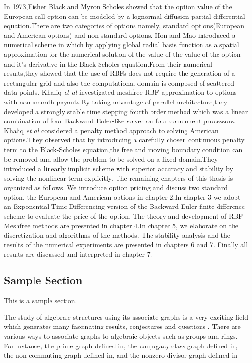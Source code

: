 \documentclass[12pt]{article}
\numberwithin{equation}{section} %
\begin{document}
In 1973,Fisher Black and Myron Scholes showed that the option value
of the European call option can be modeled by a lognormal diffusion
partial differential equation.There are two categories of options
namely, standard options(European and American options) and non
standard options.
 Hon and Mao\cite{Hon} introduced a numerical scheme in which by
 applying global radial basis function as a spatial approximation
 for the numerical solution of the value of the  value of the option
 and it's derivative in the Black-Scholes equation.From their
 numerical results,they showed that the use of RBFs does not require
 the generation of a rectangular grid and also the computational
 domain is composed of scattered data points.
 Khaliq \textit{et al}\cite{KK} investigated meshfree RBF approximation to
 options with non-smooth payouts.By taking advantage of parallel
 architecture,they developed a strongly stable time stepping fourth
 order method which was a linear combination of four Backward
 Euler-like solver on four concurrent processors.
 Khaliq \textit{et al}\cite{ADS06} considered a penalty method
 approach to solving  American options.They observed that by
 introducing a carefully chosen continuous penalty term to the
 Black-Scholes equation,the free and moving boundary condition can
 be removed and allow the problem to be solved on a fixed
 domain.They introduced a linearly implicit scheme with superior
 accuracy and stability by solving the nonlinear term explicitly.
 The remaining chapters of this thesis is organized  as follows.
 We introduce option pricing and discuss two standard option,
 the European and American options in chapter 2.In chapter 3 we adopt an Exponential
 Time Differencing version of the Backward Euler finite difference
  scheme to evaluate the price of the option. The theory and development of RBF
  Meshfree methods are presented in chapter 4.In chapter 5, we elaborate on the
  discretization and algorithms of the methods. The stability analysis and the
  results of the numerical experiments are presented in chapters 6 and 7.
  Finally all results are discussed and interpreted in chapter 7.

\subsection{Sample Section} This is a sample section.

The study of algebraic structures using its associate graphs is a
very exciting field which generates many fascinating results,
conjectures and questions \cite{Abdollahi2006}. There are various
ways to associate graphs to algebraic objects such as groups and
rings. For instance, the prime graph defined in\cite{Williams1981},
the conjugacy class graph defined in\cite{Bertram}, the
non-commuting graph defined in\cite{Abdollahi2006}, and the nonzero
divisor graph defined in\cite{DavidAnderson}
\end{document}
